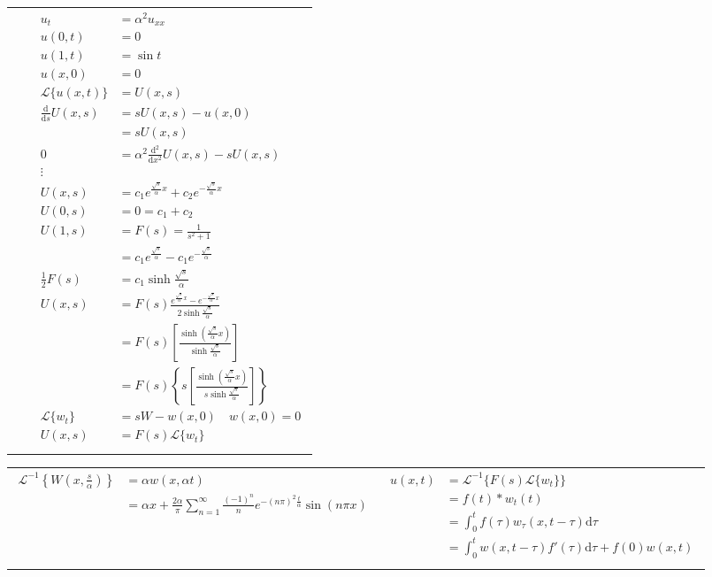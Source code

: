 \documentclass{article}
\begin{document}
\begin{longtabu}{X|X}
{\begin{align*}
  \end{align*}}
  &
  {\begin{align*}
    u_t&=\alpha^2u_{xx}\\
    u(0,t)&=0\\
    u(1,t)&=\sin t\\
    u(x,0)&=0\\
    \mathscr{L}\{u(x,t)\}&=U(x,s)\\
    \frac{\mathrm{d}}{\mathrm{d}s}U(x,s)&=sU(x,s)-u(x,0)\\
    &=sU(x,s)\\
    0&=\alpha^2\frac{\mathrm{d}^2}{\mathrm{d}x^2}U(x,s)-sU(x,s)\\
    \vdots\\
    U(x,s)&=c_1e^{\frac{\sqrt{s}}{\alpha}x}+c_2e^{-\frac{\sqrt{s}}{\alpha}x}\\
    U(0,s)&=0=c_1+c_2\\
    U(1,s)&=F(s)=\frac{1}{s^2+1}\\
    &=c_1e^{\frac{\sqrt{s}}{\alpha}}-c_1e^{-\frac{\sqrt{s}}{\alpha}}\\
    \frac{1}{2}F(s)&=c_1\sinh\frac{\sqrt{s}}{\alpha}\\
    U(x,s)&=F(s)\frac{e^{\frac{\sqrt{s}}{\alpha}x}-e^{-\frac{\sqrt{s}}{\alpha}x}}{2\sinh\frac{\sqrt{s}}{\alpha}}\\
    &=F(s)\left[\frac{\sinh\left(\frac{\sqrt{s}}{\alpha}x\right)}{\sinh\frac{\sqrt{s}}{\alpha}}\right]\\
    &=F(s)\left\{s\left[\frac{\sinh\left(\frac{\sqrt{s}}{\alpha}x\right)}{s\sinh\frac{\sqrt{s}}{\alpha}}\right]\right\}\\
    \mathscr{L}\{w_t\}&=sW-w(x,0)\quad w(x,0)=0\\
    U(x,s)&=F(s)\mathscr{L}\{w_t\}\\
  \end{align*}}
\end{longtabu}
\begin{longtabu}{X|X}
  {\begin{align*}
    \mathscr{L}^{-1}\left\{W\left(x,\frac{s}{\alpha}\right)\right\}&=\alpha w(x,\alpha t)\\
    &=\alpha x+\frac{2\alpha}{\pi}\sum\limits_{n=1}^\infty{\frac{(-1)^n}{n}e^{-(n\pi)^2\frac{t}{\alpha}}\sin(n\pi x)}\\
  \end{align*}}
  &
  {\begin{align*}
    u(x,t)&=\mathscr{L}^{-1}\{F(s)\mathscr{L}\{w_t\}\}\\
    &=f(t)*w_t(t)\\
    &=\int_0^t{f(\tau)w_\tau(x,t-\tau)\mathrm{d}\tau}\\
    &=\int_0^t{w(x,t-\tau)f'(\tau)\mathrm{d}\tau}+f(0)w(x,t)\\
  \end{align*}}
\end{longtabu}
\end{document}
